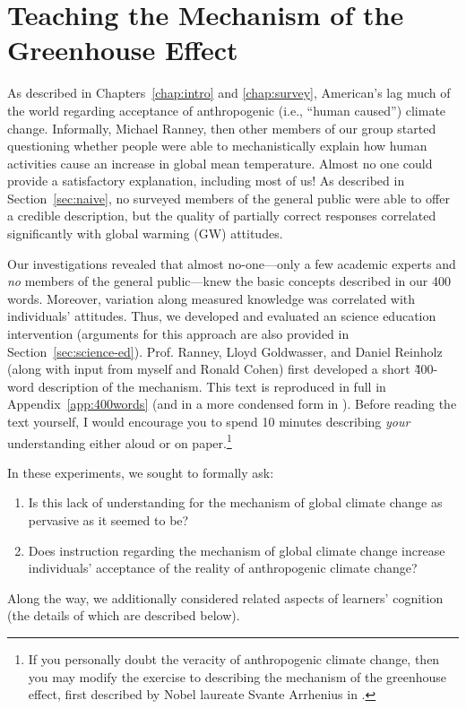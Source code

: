 \graphicspath{{mechanism/}}

\chapter{Teaching the Mechanism of the Greenhouse Effect}
\label{chap:mechanism}

As described in Chapters~\ref{chap:intro} and \ref{chap:survey}, American's lag
much of the world regarding acceptance of anthropogenic (i.e., “human caused”)
climate change. Informally, Michael Ranney, then other members of our group
started questioning whether people were able to mechanistically explain how
human activities cause an increase in global mean temperature.  Almost no one
could provide a satisfactory explanation, including most of us! As described in
Section~\ref{sec:naive}, no surveyed members of the general public were able to
offer a credible description, but the quality of partially correct responses
correlated significantly with global warming (GW) attitudes. 

Our investigations revealed that almost no-one---only a few academic
experts and \emph{no} members of the general public---knew the basic
concepts described in our 400 words. Moreover, variation along measured
knowledge was correlated with individuals' attitudes. Thus, we developed and evaluated an
science education intervention (arguments for this approach are also provided in
Section~\ref{sec:science-ed}). Prof. Ranney, Lloyd Goldwasser, and Daniel
Reinholz (along with input from myself and Ronald Cohen) first developed a
short \~400-word description of the mechanism. This text is reproduced in full
in Appendix~\ref{app:400words} (and in a more condensed form in
).  Before reading the text yourself, I would
encourage you to spend 10 minutes describing \emph{your} understanding either
aloud or on paper.\footnote{If you personally doubt the veracity of
    anthropogenic climate change, then you may modify the exercise to describing
    the mechanism of the greenhouse effect, first described by Nobel laureate
    Svante Arrhenius in \citeyear{arrhenius_influence_1896}.}

 In these experiments, we sought to formally ask:
\begin{enumerate}
\item Is this lack of understanding for the mechanism of global climate change
    as pervasive as it seemed to be?
\item Does instruction regarding the mechanism of global climate change increase
    individuals' acceptance of the reality of anthropogenic climate change?
\end{enumerate}
Along the way, we additionally considered related aspects of learners'
cognition (the details of which are described below).

